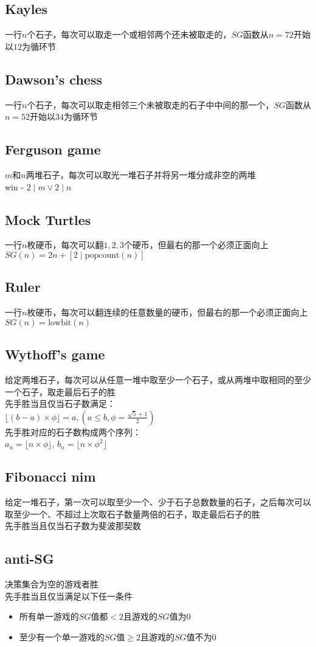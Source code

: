 \subsection*{Kayles}
    一行$ n $个石子，每次可以取走一个或相邻两个还未被取走的，$ SG $函数从$ n = 72 $开始以$ 12 $为循环节
\subsection*{Dawson's chess}
    一行$ n $个石子，每次可以取走相邻三个未被取走的石子中中间的那一个，$ SG $函数从$ n = 52 $开始以$ 34 $为循环节
\subsection*{Ferguson game}
    $ m $和$ n $两堆石子，每次可以取光一堆石子并将另一堆分成非空的两堆\\
    win - $ 2 \mid m \lor 2 \mid n $
\subsection*{Mock Turtles}
    一行$ n $枚硬币，每次可以翻$ 1, 2, 3 $个硬币，但最右的那一个必须正面向上\\
    $ SG(n) = 2n + [2 \mid \text{popcount}(n)] $
\subsection*{Ruler}
    一行$ n $枚硬币，每次可以翻连续的任意数量的硬币，但最右的那一个必须正面向上\\
    $ SG(n) = \text{lowbit}(n) $
\subsection*{Wythoff's game}
    给定两堆石子，每次可以从任意一堆中取至少一个石子，或从两堆中取相同的至少一个石子，取走最后石子的胜
    \\先手胜当且仅当石子数满足：
    \\$\lfloor (b - a) \times \phi \rfloor=a, (a \leq b, \phi = \frac{\sqrt{5} + 1}{2})$
    \\先手胜对应的石子数构成两个序列：
    \\$a_n = \lfloor n \times \phi \rfloor$, $b_n = \lfloor n \times \phi ^ 2 \rfloor$
\subsection*{Fibonacci nim}
    给定一堆石子，第一次可以取至少一个、少于石子总数数量的石子，之后每次可以取至少一个、不超过上次取石子数量两倍的石子，取走最后石子的胜
    \\先手胜当且仅当石子数为斐波那契数
\subsection*{anti-SG}
    决策集合为空的游戏者胜
    \\先手胜当且仅当满足以下任一条件
    \begin{itemize}[nosep,wide=0pt]
        \item 所有单一游戏的$ SG $值都$ < 2 $且游戏的$ SG $值为$ 0 $
        \item 至少有一个单一游戏的$ SG $值$ \geq 2 $且游戏的$ SG $值不为$ 0 $
    \end{itemize}
